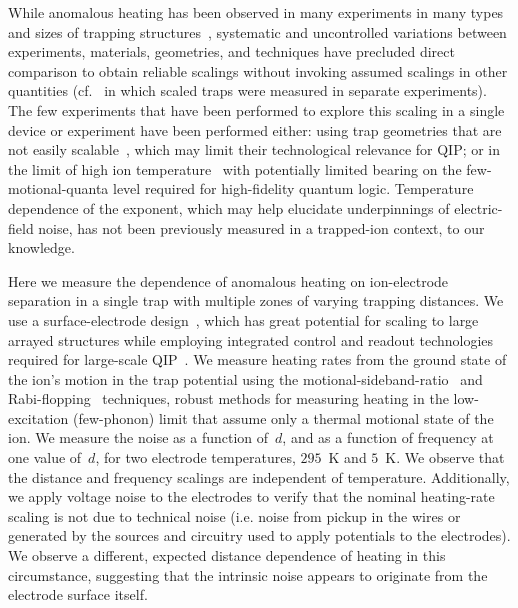 \documentclass[reprint,twocolumn,prl,amsmath,amssymb,longbibliography,aps,superscriptaddress]{revtex4-1}
\begin{document}
While anomalous heating has been observed in many experiments in many types and sizes of trapping structures~\cite{Brownnutt2015}, systematic and uncontrolled variations between experiments, materials, geometries, and techniques have precluded direct comparison to obtain reliable scalings without invoking assumed scalings in other quantities (cf.~\cite{Turchette2000} in which scaled traps were measured in separate experiments).  The few experiments that have been performed to explore this scaling in a single device or experiment have been performed either:  using trap geometries that are not easily scalable~\cite{PhysRevLett.97.103007,hite_mckay_kotler_leibfried_wineland_pappas_2017}, which may limit their technological relevance for QIP; or in the limit of high ion temperature~\cite{wunderlich_arXiv_2017} with potentially limited bearing on the few-motional-quanta level required for high-fidelity quantum logic.  Temperature dependence of the exponent, which may help elucidate underpinnings of electric-field noise, has not been previously measured in a trapped-ion context, to our knowledge.

Here we measure the dependence of anomalous heating on ion-electrode separation in a single trap with multiple zones of varying trapping distances.  We use a surface-electrode design~\cite{NIST:SET:QIC:05}, which has great potential for scaling to large arrayed structures while employing integrated control and readout technologies required for large-scale QIP~\cite{Mehta_NNano_2016,Lekitsch2017}.  We measure heating rates from the ground state of the ion's motion in the trap potential using the motional-sideband-ratio~\cite{PhysRevLett.75.4011} and Rabi-flopping~\cite{RoweQIC2002} techniques, robust methods for measuring heating in the low-excitation (few-phonon) limit that assume only a thermal motional state of the ion.  We measure the noise as a function of~$d$, and as a function of frequency at one value of~$d$, for two electrode temperatures, $295$~K and $5$~K.  We observe that the distance and frequency scalings are independent of temperature.  Additionally, we apply voltage noise to the electrodes to verify that the nominal heating-rate scaling is not due to technical noise (i.e. noise from pickup in the wires or generated by the sources and circuitry used to apply potentials to the electrodes).  We observe a different, expected distance dependence of heating in this circumstance, suggesting that the intrinsic noise appears to originate from the electrode surface itself.
\end{document}
